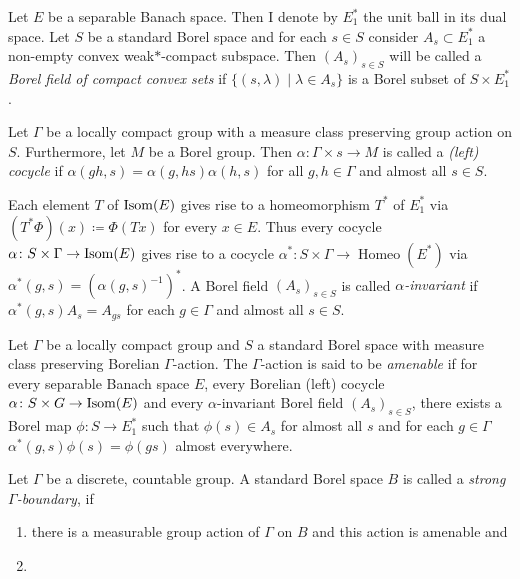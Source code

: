 \begin{defin}
  Let \(E\) be a separable Banach space. Then I denote by \(E^\ast_1\) the unit ball in its dual space. Let \(S\) be a standard Borel space and for each \(s \in S\) consider \(A_s \subset E^\ast_1\) a non-empty convex weak\(\ast\)-compact subspace. Then \((A_s)_{s \in S}\) will be called a \emph{Borel field of compact convex sets} if \(\{(s, \lambda) \mid \lambda \in A_s\}\) is a Borel subset of \(S \times E^\ast_1\).

  Let \(\Gamma\) be a locally compact group with a measure class preserving group action on \(S\). Furthermore, let \(M\) be a Borel group. Then \(\alpha \colon \Gamma \times s \to M\) is called a \emph{(left) cocycle} if \(\alpha(gh, s) = \alpha(g, hs) \alpha(h, s)\) for all \(g, h \in \Gamma\) and almost all \(s \in S\).

  Each element \(T\) of \(\operatorname{Isom}(E)\) gives rise to a homeomorphism \(T^\ast\) of \(E^\ast_1\) via \((T^\ast\Phi)(x) \coloneqq \Phi(Tx)\) for every \(x \in E\). Thus every cocycle \(\alpha \colon S \times \Gamma \to \operatorname{Isom}(E)\) gives rise to a cocycle \(\alpha^\ast \colon S \times \Gamma \to \operatorname{Homeo}(E^\ast)\) via \(\alpha^\ast (g, s) = (\alpha(g, s)^{-1})^\ast\). A Borel field \((A_s)_{s \in S}\) is called \emph{\(\alpha\)-invariant} if \(\alpha^\ast(g, s) A_{s} = A_{gs}\) for each \(g \in \Gamma\) and almost all \(s \in S\).
  
  Let \(\Gamma\) be a locally compact group and \(S\) a standard Borel space with measure class preserving Borelian \(\Gamma\)-action. The \(\Gamma\)-action is said to be \emph{amenable} if for every separable Banach space \(E\), every Borelian (left) cocycle \(\alpha \colon S \times G \to \operatorname{Isom}(E)\) and every \(\alpha\)-invariant Borel field \((A_s)_{s \in S}\), there exists a Borel map \(\phi \colon S \to E^\ast_1\) such that \(\phi(s) \in A_s\) for almost all \(s\) and for each \(g \in \Gamma\)\(\alpha^\ast(g, s) \phi(s) = \phi(gs)\) almost everywhere.
\end{defin}

\begin{defin}
  Let \(\Gamma\) be a discrete, countable group. A standard Borel space \(B\) is called a \emph{strong \(\Gamma\)-boundary}, if
  \begin{enumerate}
  \item there is a measurable group action of \(\Gamma\) on \(B\) and this action is amenable and
  \item 
  \end{enumerate}
\end{defin}

